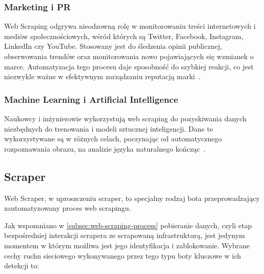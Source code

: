 \subsubsection{Marketing i PR}

Web Scraping odgrywa nieodzowną rolę w monitorowaniu treści internetowych i mediów społecznościowych, wśród których są Twitter, Facebook, Instagram, LinkedIn czy YouTube.
Stosowany jest do śledzenia opinii publicznej, obserwowania trendów oraz monitorowania nowo pojawiających się wzmianek o marce.
Automatyzacja tego procesu daje sposobność do szybkiej reakcji, co jest niezwykle ważne w efektywnym zarządzaniu reputacją marki~\cite{monitoring-social-media}.

\subsubsection{Machine Learning i Artificial Intelligence}

Naukowcy i inżynierowie wykorzystują web scraping do pozyskiwania danych niezbędnych do trenowania i modeli sztucznej inteligencji.
Dane te wykorzystywane są w różnych celach, poczynając od automatycznego rozpoznawania obrazu, na analizie języka naturalnego kończąc~\cite{openai-data-collection}.

\subsection{Scraper}\label{subsec:scraper}

Web Scraper, w uproszczeniu scraper, to specjalny rodzaj bota przeprowadzający zautomatyzowany proces web scrapingu.

Jak wspomniano w \autoref{subsec:web-scraping-process} pobieranie danych, czyli etap bezpośredniej interakcji scrapera ze scrapowaną infrastrukturą,
jest jedynym momentem w którym możliwa jest jego identyfikacja i zablokowanie.
Wybrane cechy ruchu sieciowego wykonywanego przez tego typu boty kluczowe w ich detekcji to:


